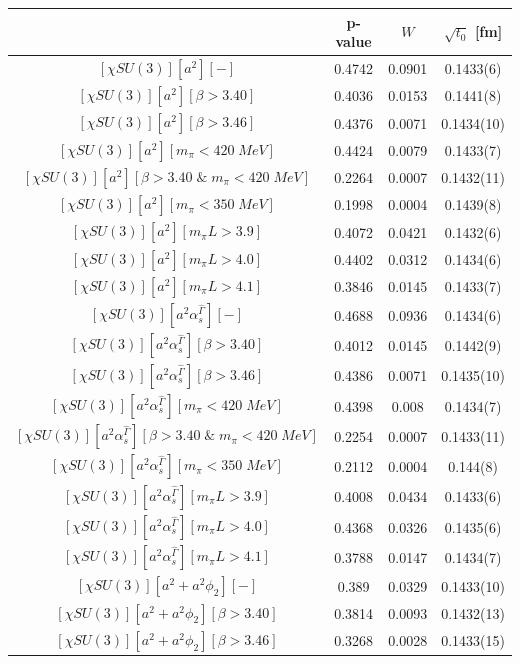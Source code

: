 \begin{longtable}{ c | c | c | c }
\toprule
 & p-value & $W$ & $\sqrt{t_0}$ [fm] \\
\midrule
$[\chi SU(3)][a^2][-]$ & 0.4742 & 0.0901 & 0.1433(6) \\
$[\chi SU(3)][a^2][\beta>3.40]$ & 0.4036 & 0.0153 & 0.1441(8) \\
$[\chi SU(3)][a^2][\beta>3.46]$ & 0.4376 & 0.0071 & 0.1434(10) \\
$[\chi SU(3)][a^2][m_{\pi}<420\;MeV]$ & 0.4424 & 0.0079 & 0.1433(7) \\
$[\chi SU(3)][a^2][\beta>3.40\;\&\;m_{\pi}<420\;MeV]$ & 0.2264 & 0.0007 & 0.1432(11) \\
$[\chi SU(3)][a^2][m_{\pi}<350\;MeV]$ & 0.1998 & 0.0004 & 0.1439(8) \\
$[\chi SU(3)][a^2][m_{\pi}L>3.9]$ & 0.4072 & 0.0421 & 0.1432(6) \\
$[\chi SU(3)][a^2][m_{\pi}L>4.0]$ & 0.4402 & 0.0312 & 0.1434(6) \\
$[\chi SU(3)][a^2][m_{\pi}L>4.1]$ & 0.3846 & 0.0145 & 0.1433(7) \\
$[\chi SU(3)][a^2\alpha_s^{\hat{\Gamma}}][-]$ & 0.4688 & 0.0936 & 0.1434(6) \\
$[\chi SU(3)][a^2\alpha_s^{\hat{\Gamma}}][\beta>3.40]$ & 0.4012 & 0.0145 & 0.1442(9) \\
$[\chi SU(3)][a^2\alpha_s^{\hat{\Gamma}}][\beta>3.46]$ & 0.4386 & 0.0071 & 0.1435(10) \\
$[\chi SU(3)][a^2\alpha_s^{\hat{\Gamma}}][m_{\pi}<420\;MeV]$ & 0.4398 & 0.008 & 0.1434(7) \\
$[\chi SU(3)][a^2\alpha_s^{\hat{\Gamma}}][\beta>3.40\;\&\;m_{\pi}<420\;MeV]$ & 0.2254 & 0.0007 & 0.1433(11) \\
$[\chi SU(3)][a^2\alpha_s^{\hat{\Gamma}}][m_{\pi}<350\;MeV]$ & 0.2112 & 0.0004 & 0.144(8) \\
$[\chi SU(3)][a^2\alpha_s^{\hat{\Gamma}}][m_{\pi}L>3.9]$ & 0.4008 & 0.0434 & 0.1433(6) \\
$[\chi SU(3)][a^2\alpha_s^{\hat{\Gamma}}][m_{\pi}L>4.0]$ & 0.4368 & 0.0326 & 0.1435(6) \\
$[\chi SU(3)][a^2\alpha_s^{\hat{\Gamma}}][m_{\pi}L>4.1]$ & 0.3788 & 0.0147 & 0.1434(7) \\
$[\chi SU(3)][a^2+a^2\phi_2][-]$ & 0.389 & 0.0329 & 0.1433(10) \\
$[\chi SU(3)][a^2+a^2\phi_2][\beta>3.40]$ & 0.3814 & 0.0093 & 0.1432(13) \\
$[\chi SU(3)][a^2+a^2\phi_2][\beta>3.46]$ & 0.3268 & 0.0028 & 0.1433(15) \\

\end{longtable}
